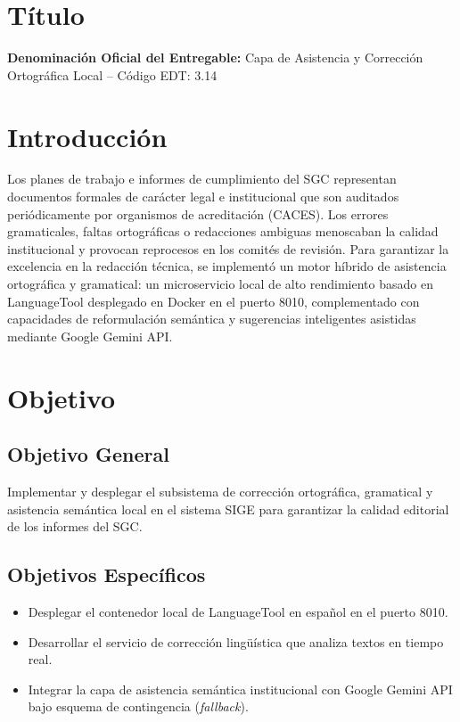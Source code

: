 \documentclass[12pt,a4paper]{article}
\begin{document}
\section{Título}
\textbf{Denominación Oficial del Entregable:} Capa de Asistencia y Corrección Ortográfica Local -- Código EDT: 3.14

\section{Introducción}
Los planes de trabajo e informes de cumplimiento del SGC representan documentos formales de carácter legal e institucional que son auditados periódicamente por organismos de acreditación (CACES). Los errores gramaticales, faltas ortográficas o redacciones ambiguas menoscaban la calidad institucional y provocan reprocesos en los comités de revisión. Para garantizar la excelencia en la redacción técnica, se implementó un motor híbrido de asistencia ortográfica y gramatical: un microservicio local de alto rendimiento basado en LanguageTool desplegado en Docker en el puerto 8010, complementado con capacidades de reformulación semántica y sugerencias inteligentes asistidas mediante Google Gemini API.

\section{Objetivo}
\subsection{Objetivo General}
Implementar y desplegar el subsistema de corrección ortográfica, gramatical y asistencia semántica local en el sistema SIGE para garantizar la calidad editorial de los informes del SGC.
\subsection{Objetivos Específicos}
\begin{itemize}[leftmargin=1.5em, itemsep=2pt]
    \item Desplegar el contenedor local de LanguageTool en español en el puerto 8010.
    \item Desarrollar el servicio de corrección lingüística que analiza textos en tiempo real.
    \item Integrar la capa de asistencia semántica institucional con Google Gemini API bajo esquema de contingencia (\textit{fallback}).
\end{itemize}
\end{document}
